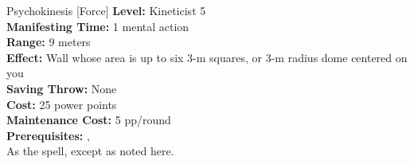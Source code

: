 {Psychokinesis [Force]}
{
	\textbf{Level:}
	Kineticist 5\\
	\textbf{Manifesting Time:}
	1 mental action\\
	\textbf{Range:}
	9 meters\\
	\textbf{Effect:}
	Wall whose area is up to six 3-m squares, or 3-m radius dome centered on you\\
	\textbf{Saving Throw:}
	None\\
	\textbf{Cost:}
	25 power points\\
	\textbf{Maintenance Cost:}
	5 pp/round\\
	\textbf{Prerequisites:}
	, \\
}
{
	As the  spell, except as noted here.
}